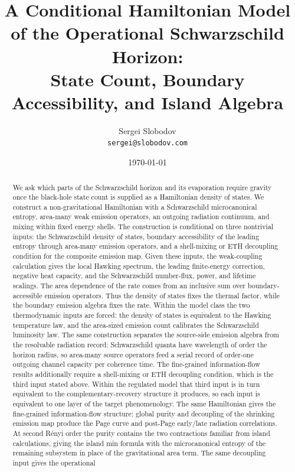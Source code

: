 \documentclass[12pt]{article}
\title{A Conditional Hamiltonian Model of the Operational Schwarzschild
Horizon:\\
State Count, Boundary Accessibility, and Island Algebra}
\author{Sergei Slobodov\\\texttt{sergei@slobodov.com}}
\date{\today}
\begin{document}
\maketitle

\begin{abstract}
We ask which parts of the Schwarzschild horizon and its evaporation require
gravity once the
black-hole state count is supplied as a Hamiltonian density of states.  We
construct a non-gravitational Hamiltonian with a Schwarzschild microcanonical
entropy, area-many weak emission operators, an outgoing radiation continuum,
and mixing within fixed energy shells.
The construction is conditional on three nontrivial inputs: the Schwarzschild
density of states, boundary accessibility of the leading entropy through
area-many emission operators, and a shell-mixing or ETH decoupling condition
for the composite emission map.  Given these inputs, the weak-coupling
calculation gives
the local Hawking spectrum, the leading finite-energy correction, negative
heat capacity, and the Schwarzschild number-flux, power, and lifetime
scalings.  The area dependence of the rate comes from an inclusive sum over
boundary-accessible emission operators.  Thus the density of states fixes the
thermal factor, while the boundary emission algebra fixes the rate.  Within
the model class the two thermodynamic inputs are forced: the density of states
is equivalent to the Hawking temperature law, and the area-sized emission count
calibrates the Schwarzschild luminosity law.  The same construction separates
the source-side emission algebra from the resolvable radiation record:
Schwarzschild quanta have wavelength of order the horizon radius, so
area-many source operators feed a serial record of order-one outgoing channel
capacity per coherence time.  The fine-grained
information-flow results additionally require a shell-mixing or ETH decoupling
condition, which is the third input stated above.  Within the regulated
model that third input is in turn equivalent to the complementary-recovery
structure it produces, so each input is equivalent to one layer of the
target phenomenology.  The same
Hamiltonian gives the
fine-grained information-flow structure: global purity and decoupling of the
shrinking emission map produce the Page curve and post-Page early/late
radiation correlations.  At second R\'enyi order the purity contains the two
contractions familiar from island calculations, giving the island min formula
with the microcanonical entropy of the remaining subsystem in place of the
gravitational area term.  The same decoupling input gives the operational

\end{abstract}
\end{document}
